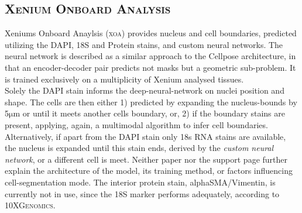 \subsection*{\color{xenium}\textsc{Xenium Onboard Analysis}}
Xeniums Onboard Anaylsis (\textsc{xoa}) provides nucleus and cell boundaries, predicted utilizing the DAPI, 18S and Protein stains, and custom neural networks. The neural network is described as a similar approach to the Cellpose architecture, in that an encoder-decoder pair predicts not masks but a geometric sub-problem. It is trained exclusively on a multiplicity of Xenium analysed tissues. \cite{janesick_high_2023} \cite{noauthor_nucleus_nodate} \cite{noauthor_understanding_nodate}\\
Solely the DAPI stain informs the deep-neural-network on nuclei position and shape. The cells are then either 1) predicted by expanding the nucleus-bounds by 5$\unit{\micro\meter}$ or until it meets another cells boundary, or, 2) if the boundary stains are present, applying, again, a multimodal algorithm to infer cell boundaries. Alternatively, if apart from the DAPI stain only 18s RNA stains are available, the nucleus is expanded until this stain ends, derived by the \textit{custom neural network}, or a different cell is meet. Neither paper nor the support page further explain the architecture of the model, its training method, or factors influencing cell-segmentation mode. The interior protein stain, alphaSMA/Vimentin, is currently not in use, since the 18S marker performs adequately, according to \textsc{10XGenomics}\cite{noauthor_nucleus_nodate}.